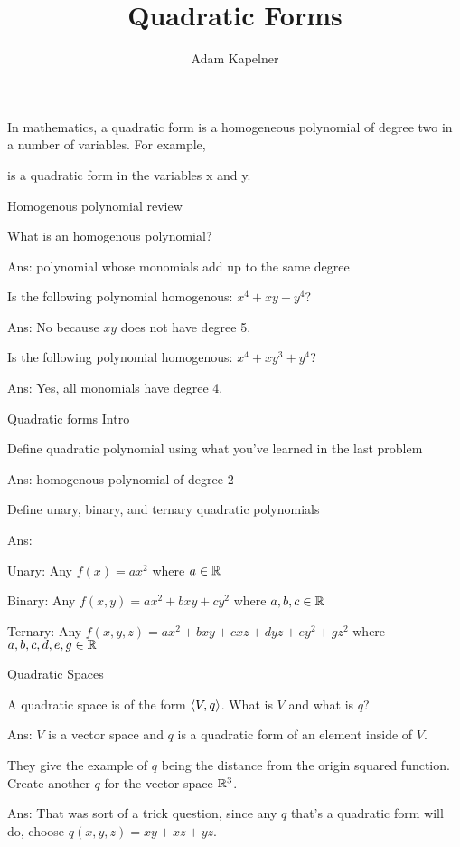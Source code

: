 \documentclass[12pt]{article}
\title{Quadratic Forms}
\author{Adam Kapelner}
\begin{document}
\maketitle

In mathematics, a quadratic form is a homogeneous polynomial of degree two in a number of variables. For example,

is a quadratic form in the variables x and y.

\problem Homogenous polynomial review

\benum
\easysubproblem What is an homogenous polynomial?

Ans: polynomial whose monomials add up to the same degree

\easysubproblem Is the following polynomial homogenous: $x^4 + xy + y^4$?

Ans: No because $xy$ does not have degree 5.

\easysubproblem Is the following polynomial homogenous: $x^4 + xy^3 + y^4$? 

Ans: Yes, all monomials have degree 4.

\eenum 

\problem Quadratic forms Intro

\benum
\easysubproblem Define quadratic polynomial using what you've learned in the last problem

Ans: homogenous polynomial of degree 2

\easysubproblem Define unary, binary, and ternary quadratic polynomials

Ans: \benum
\item[Unary:] Any $f(x) = ax^2$ where $a \in \mathbb{R}$
\item[Binary:] Any $f(x,y) = ax^2 + bxy + cy^2$ where $a,b,c \in \mathbb{R}$
\item[Ternary:] Any $f(x,y,z) = ax^2 + bxy + cxz + dyz + ey^2 + gz^2$ where $a,b,c,d,e,g \in \mathbb{R}$
\eenum
\eenum

\problem Quadratic Spaces

\benum
\easysubproblem A quadratic space is of the form $\left<V, q\right>$. What is $V$ and what is $q$?

Ans: $V$ is a vector space and $q$ is a quadratic form of an element inside of $V$.

\easysubproblem They give the example of $q$ being the distance from the origin squared function. Create another $q$ for the vector space $\mathbb{R}^3$.

Ans: That was sort of a trick question, since any $q$ that's a quadratic form will do, choose $q(x,y,z) = xy + xz + yz$. 
\end{document}
